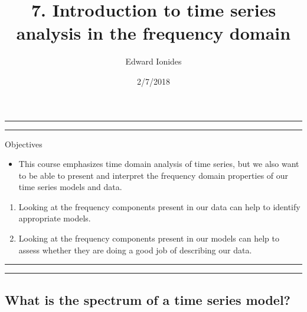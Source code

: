 \documentclass[]{article}
\title{7. Introduction to time series analysis in the frequency domain}
\author{Edward Ionides}
\date{2/7/2018}
\providecommand{\tightlist}{%
  \setlength{\itemsep}{0pt}\setlength{\parskip}{0pt}}
\begin{document}
\maketitle

{
\setcounter{tocdepth}{2}
\tableofcontents
}
\newcommand\prob{\mathbb{P}}
\newcommand\E{\mathbb{E}}
\newcommand\var{\mathrm{Var}}
\newcommand\cov{\mathrm{Cov}}
\newcommand\loglik{\ell}
\newcommand\R{\mathbb{R}}
\newcommand\data[1]{#1^*}
\newcommand\params{\, ; \,}
\newcommand\eqspace{\quad\quad\quad}
\newcommand\lik{\mathscr{L}}
\newcommand\profileloglik[1]{\ell^\mathrm{profile}_#1}
\newcommand\ar{\phi}
\newcommand\ma{\psi}
\newcommand\AR{\Phi}
\newcommand\MA{\Psi}
\newcommand\ev{u}





\begin{center}\rule{0.5\linewidth}{\linethickness}\end{center}

\begin{center}\rule{0.5\linewidth}{\linethickness}\end{center}

Objectives

\begin{itemize}
\tightlist
\item
  This course emphasizes time domain analysis of time series, but we
  also want to be able to present and interpret the frequency domain
  properties of our time series models and data.
\end{itemize}

\begin{enumerate}
\def\labelenumi{\arabic{enumi}.}
\item
  Looking at the frequency components present in our data can help to
  identify appropriate models.
\item
  Looking at the frequency components present in our models can help to
  assess whether they are doing a good job of describing our data.
\end{enumerate}

\begin{center}\rule{0.5\linewidth}{\linethickness}\end{center}

\begin{center}\rule{0.5\linewidth}{\linethickness}\end{center}

\subsection{What is the spectrum of a time series
model?}\label{what-is-the-spectrum-of-a-time-series-model}
\end{document}
